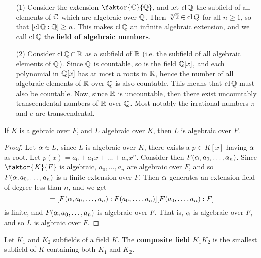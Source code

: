   \begin{example}\label{example_8.9}
    \begin{enumerate}
      \item[(1)] Consider the extension $\faktor{\C}{\Q}$, and let $\operatorname{cl}{\mathbb{Q}}$
        the subfield of all elements of $\mathbb{C}$ which are algebraic over
        $\mathbb{Q}$. Then $\sqrt[n]{2} \in \operatorname{cl}{Q}$ for all $n \geq 1$, so that
        $[\operatorname{cl}{\mathbb{Q}}:\mathbb{Q}] \geq n$. This makes $\operatorname{cl}{\mathbb{Q}}$ an infinite algebraic
        extension, and we call $\operatorname{cl}{\mathbb{Q}}$ the \textbf{field of algebraic
        numbers}.

      \item[(2)] Consider $\operatorname{cl}{\mathbb{Q}} \cap \mathbb{R}$ as a subfield of $\mathbb{R}$ (i.e. the
        subfield of all algebraic elements of $\mathbb{Q}$). Since  $\mathbb{Q}$ is
        countable, so is the field  $\mathbb{Q}[x]$, and each polynomial in $\mathbb{Q}[x]$
        has at most $n$ roots in  $\mathbb{R}$, hence the number of all algebraic
        elements of $\mathbb{R}$ over $\mathbb{Q}$ is also countable. This means that
        $\operatorname{cl}{\mathbb{Q}}$ must also be countable. Now, since $\mathbb{R}$ is uncountable,
        then there exist uncountably transcendental numbers of  $\mathbb{R}$ over
        $\mathbb{Q}$. Most notably the irrational numbers  $\pi$ and  $e$ are
        transcendental.
    \end{enumerate}
  \end{example}

  \begin{theorem}\label{theorem_8.2.7}
    If $K$ is algebraic over  $F$, and  $L$ algebraic over  $K$, then  $L$ is
    algebraic over  $F$.
  \end{theorem}
  \begin{proof}
    Let $\alpha \in L$, since  $L$ is algebraic over  $K$, there exists a  $p \in
    K[x]$ having $\alpha$ as root. Let $p(x)=a_0+a_1x+\dots+a_nx^n$. Consider then
    $F(\alpha,a_0, \dots, a_n)$. Since $\faktor{K}{F}$ is algebraic, $a_0, \dots,
    a_n$ are algebraic over $F$, and so  $F(\alpha, a_0, \dots, a_n)$ is a finite
    extension over $F$. Then $\alpha$ generates an extension field of degree less
    than $n$, and we get
    \begin{equation*}
      [F(\a, a_0, \dots, a_n):F]=
      [F(\a, a_0, \dots, a_n):F(a_0, \dots, a_n)][F(a_0, \dots,a_n):F]
    \end{equation*}
    is finite, and $F(\alpha,a_0, \dots, a_n)$ is algebraic over $F$. That is,
    $\alpha$ is algebraic over  $F$, and so  $L$ is algbraic over  $F$.
  \end{proof}

  \begin{definition}
    Let $K_1$ and $K_2$ subfields of a field $K$. The  \textbf{composite field}
    $K_1K_2$ is the smallest subfield of $K$ containing both  $K_1$ and $K_2$.
  \end{definition}

